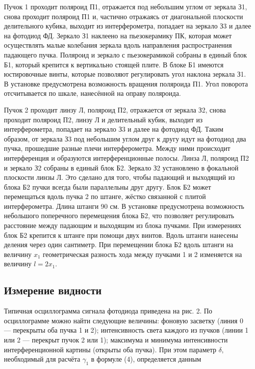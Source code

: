\documentclass[a4paper, 12pt]{article}%
\begin{document}
Пучок 1 проходит поляроид П1, отражается под небольшим углом от зеркала З1, снова проходит поляроид П1 и, частично отражаясь от диагональной плоскости делительного кубика, выходит из интерферометра, попадает на зеркало З3 и далее на фотодиод ФД. Зеркало З1 наклеено на пьезокерамику ПК, которая может осуществлять малые колебания зеркала вдоль направления распространения падающего пучка. Поляроид и зеркало с пьезокерамикой собраны в единый блок Б1, который крепится к вертикально стоящей плите. В блоке Б1 имеются юстировочные винты, которые позволяют регулировать угол наклона зеркала З1. В установке предусмотрена возможность вращения поляроида П1. Угол поворота отсчитывается по шкале, нанесённой на оправу поляроида.

Пучок 2 проходит линзу Л, поляроид П2, отражается от зеркала З2, снова проходит поляроид П2, линзу Л и делительный кубик, выходит из интерферометра, попадает на зеркало З3 и далее на фотодиод ФД. Таким образом, от зеркала З3 под небольшим углом друг к другу идут на фотодиод два пучка, прошедшие разные плечи интерферометра. Между ними происходит интерференция и образуются интерференционные полосы. Линза Л, поляроид П2 и зеркало З2 собраны в единый блок Б2. Зеркало З2 установлено в фокальной плоскости линзы Л. Это сделано для того, чтобы падающий и выходящий из блока Б2 пучки всегда были
параллельны друг другу. Блок Б2 может перемещаться вдоль пучка 2 по штанге, жёстко связанной с плитой интерферометра. Длина штанги 90 см. В установке предусмотрена возможность небольшого поперечного перемещения блока Б2, что позволяет регулировать расстояние между падающим и выходящим из блока пучками. При измерениях блок Б2 крепится к штанге при помощи двух винтов. Вдоль штанги нанесены деления через один сантиметр. При перемещении блока Б2 вдоль штанги на величину $x_1$ геометрическая разность хода между пучками 1 и 2 изменяется на величину $l = 2x_1$.

\subsection*{Измерение видности}
Типичная осциллограмма сигнала фотодиода приведена на рис. 2. По осциллограмме можно найти следующие величины: фоновую засветку (линия 0 — перекрыты оба пучка 1 и 2); интенсивность света каждого из пучков (линии 1 или 2 — перекрыт пучок 2 или 1); максимума и минимума интенсивности интерференционной
картины (открыты оба пучка). При этом параметр $\delta$, необходимый для расчёта $\gamma_1$ в формуле (4), определяется данным
\end{document}

